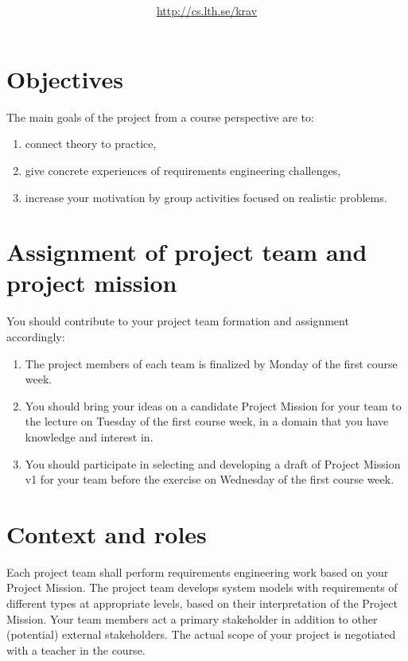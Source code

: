 \documentclass{project}
\title{\bf\sffamily\fontsize{18}{18}\selectfont{
Project~Description~\COURSECODE\\\COURSETITLE
}}
\author{\url{http://cs.lth.se/krav}}
\date{\sffamily\fontsize{10}{10}\selectfont{Revision date: \today}}
\begin{document}
\maketitle
\vspace{-1cm}

\section{Objectives}
The main goals of the project from a course perspective are to:
\begin{enumerate}[nolistsep]
\item connect theory to practice,
\item give concrete experiences of requirements engineering challenges,
\item increase your motivation by group activities focused on realistic problems.
\end{enumerate}

\section{Assignment of project team and project mission}
You should contribute to your project team formation and assignment accordingly:
\begin{enumerate}[nolistsep]
\item The project members of each team is finalized by Monday of the first course week. 
\item You should bring your ideas on a candidate Project Mission for your team to the lecture on Tuesday of the first course week, in a domain that you have knowledge and interest in.
\item You should participate in selecting and developing a draft of Project Mission v1 for your team before the exercise on Wednesday of the first course week.   
\end{enumerate}

\section{Context and roles}

\noindent Each project team shall perform requirements engineering work based on your Project Mission. The project team develops system models with requirements of different types at appropriate levels, based on their interpretation of the Project Mission. Your team members act a primary stakeholder in addition to other (potential) external stakeholders. The actual scope of your project is negotiated with a teacher in the course.
\end{document}
